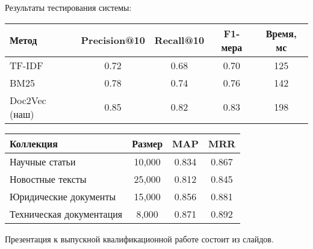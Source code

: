 \clearpage



Результаты тестирования системы:


\begin{table}[H]
	\begin{center}
		\begin{tabular}{|l|c|c|c|c|}
			\hline
			\textbf{Метод} & \textbf{Precision@10} & \textbf{Recall@10} & \textbf{F1-мера} & \textbf{Время, мс} \\
			\hline
			TF-IDF & 0.72 & 0.68 & 0.70 & 125 \\
			\hline
			BM25 & 0.78 & 0.74 & 0.76 & 142 \\
			\hline
			Doc2Vec (наш) & 0.85 & 0.82 & 0.83 & 198 \\
			\hline
		\end{tabular}
	\end{center}

\end{table}

\vspace{1cm}

\begin{table}[H]
	\begin{center}
		\begin{tabular}{|l|c|c|c|}
			\hline
			\textbf{Коллекция} & \textbf{Размер} & \textbf{MAP} & \textbf{MRR} \\
			\hline
			Научные статьи & 10,000 & 0.834 & 0.867 \\
			\hline
			Новостные тексты & 25,000 & 0.812 & 0.845 \\
			\hline
			Юридические документы & 15,000 & 0.856 & 0.881 \\
			\hline
			Техническая документация & 8,000 & 0.871 & 0.892 \\
			\hline
		\end{tabular}
	\end{center}

\end{table}


Презентация к выпускной квалификационной работе состоит из \underline{\hspace{0.5cm}} слайдов.